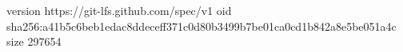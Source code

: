 version https://git-lfs.github.com/spec/v1
oid sha256:a41b5c6beb1edac8ddeceff371c0d80b3499b7be01ca0cd1b842a8e5be051a4c
size 297654
